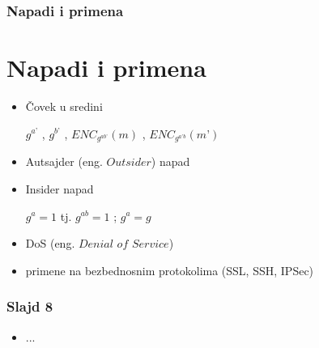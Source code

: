 \documentclass[14pt]{beamer}
\begin{document}
\begin{frame}[fragile]\frametitle{Napadi i primena}
\section{Napadi i primena}
	\begin{itemize}	
        \item Čovek u sredini 
        
        $g^{a’}$ , $g^{b’}$ , $ENC_{g^{ab’}} (m)$ , $ENC_{g^{a’b}} (m’)$
	\item Autsajder (eng. $Outsider$) napad
        \item Insider napad

        $g^{a} = 1$ tj. $g^{ab} = 1$ ; $g^a = g$
        \item DoS (eng. $Denial$ $of$ $Service$)
        \item primene na bezbednosnim protokolima (SSL, SSH, IPSec)
	\end{itemize}
\end{frame}

\begin{frame}[fragile]\frametitle{Slajd 8}
	\begin{itemize}	
		\item ...
	\end{itemize}
\end{frame}
\end{document}
